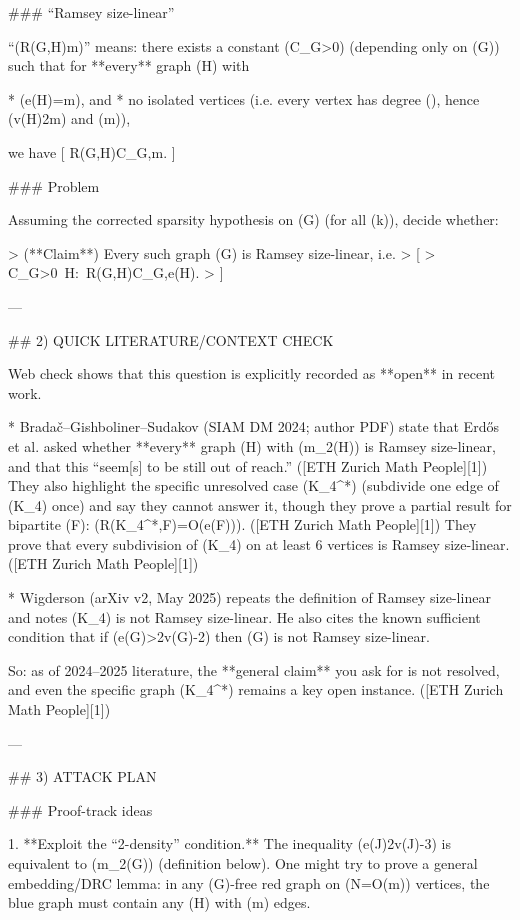 ### “Ramsey size-linear”

“(R(G,H)\ll m)” means: there exists a constant (C_G>0) (depending only on (G)) such that for **every** graph (H) with

* (e(H)=m), and
* no isolated vertices (i.e. every vertex has degree (), hence (v(H)\le 2m) and (m)),

we have
[
R(G,H)\le C_G,m.
]

### Problem

Assuming the corrected sparsity hypothesis on (G) (for all (k)), decide whether:

> (**Claim**) Every such graph (G) is Ramsey size-linear, i.e.
> [
> \exists C_G>0\ \forall H:\ R(G,H)\le C_G,e(H).
> ]

---

## 2) QUICK LITERATURE/CONTEXT CHECK

Web check shows that this question is explicitly recorded as **open** in recent work.

* Bradač–Gishboliner–Sudakov (SIAM DM 2024; author PDF) state that Erdős et al. asked whether **every** graph (H) with (m_2(H)) is Ramsey size-linear, and that this “seem[s] to be still out of reach.” ([ETH Zurich Math People][1])
  They also highlight the specific unresolved case (K_4^*) (subdivide one edge of (K_4) once) and say they cannot answer it, though they prove a partial result for bipartite (F): (R(K_4^*,F)=O(e(F))). ([ETH Zurich Math People][1])
  They prove that every subdivision of (K_4) on at least 6 vertices is Ramsey size-linear. ([ETH Zurich Math People][1])

* Wigderson (arXiv v2, May 2025) repeats the definition of Ramsey size-linear and notes (K_4) is not Ramsey size-linear. 
  He also cites the known sufficient condition that if (e(G)>2v(G)-2) then (G) is not Ramsey size-linear. 

So: as of 2024–2025 literature, the **general claim** you ask for is not resolved, and even the specific graph (K_4^*) remains a key open instance. ([ETH Zurich Math People][1])

---

## 3) ATTACK PLAN

### Proof-track ideas

1. **Exploit the “2-density” condition.**
   The inequality (e(J)\le 2v(J)-3) is equivalent to (m_2(G)) (definition below). One might try to prove a general embedding/DRC lemma: in any (G)-free red graph on (N=O(m)) vertices, the blue graph must contain any (H) with (m) edges.

